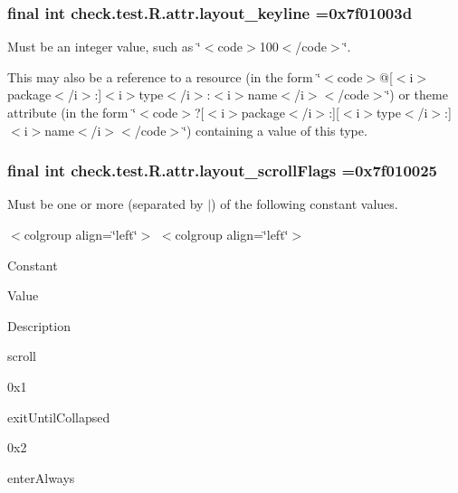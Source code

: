 \subsubsection[{layout\+\_\+keyline}]{\setlength{\rightskip}{0pt plus 5cm}final int check.\+test.\+R.\+attr.\+layout\+\_\+keyline =0x7f01003d\hspace{0.3cm}{\ttfamily [static]}}\label{classcheck_1_1test_1_1_r_1_1attr_a4471bf945a7ff92386e6b03e2f974b7d}
Must be an integer value, such as \char`\"{}$<$code$>$100$<$/code$>$\char`\"{}. 

This may also be a reference to a resource (in the form \char`\"{}$<$code$>$@\mbox{[}$<$i$>$package$<$/i$>$\+:\mbox{]}$<$i$>$type$<$/i$>$\+:$<$i$>$name$<$/i$>$$<$/code$>$\char`\"{}) or theme attribute (in the form \char`\"{}$<$code$>$?\mbox{[}$<$i$>$package$<$/i$>$\+:\mbox{]}\mbox{[}$<$i$>$type$<$/i$>$\+:\mbox{]}$<$i$>$name$<$/i$>$$<$/code$>$\char`\"{}) containing a value of this type. \hypertarget{classcheck_1_1test_1_1_r_1_1attr_a4cd51333f9028ba7b1d600246194d391}{}
\subsubsection[{layout\+\_\+scroll\+Flags}]{\setlength{\rightskip}{0pt plus 5cm}final int check.\+test.\+R.\+attr.\+layout\+\_\+scroll\+Flags =0x7f010025\hspace{0.3cm}{\ttfamily [static]}}\label{classcheck_1_1test_1_1_r_1_1attr_a4cd51333f9028ba7b1d600246194d391}
Must be one or more (separated by \textquotesingle{}$\vert$\textquotesingle{}) of the following constant values.

\begin{TabularC}{0}
\hline
\end{TabularC}
$<$colgroup align=\char`\"{}left\char`\"{}$>$ $<$colgroup align=\char`\"{}left\char`\"{}$>$ 

Constant

Value

Description 

{\ttfamily scroll}

0x1

{\ttfamily exit\+Until\+Collapsed}

0x2

{\ttfamily enter\+Always}

